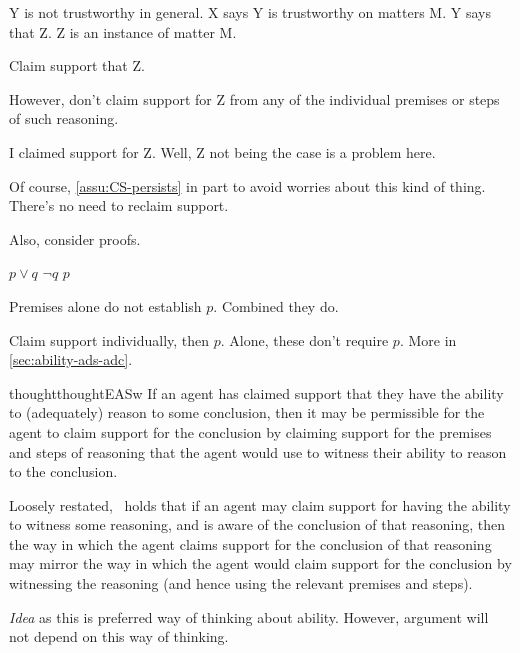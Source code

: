 \begin{note}
  Y is not trustworthy in general.
  X says Y is trustworthy on matters M.
  Y says that Z.
  Z is an instance of matter M.

  Claim support that Z.

  However, don't claim support for Z from any of the individual premises or steps of such reasoning.

  I claimed support for Z.
  Well, Z not being the case is a problem here.

  Of course, \ref{assu:CS-persists} in part to avoid worries about this kind of thing.
  There's no need to reclaim support.

  Also, consider proofs.

  \(p \lor q\)
  \(\lnot q\)
  \(p\)

  Premises alone do not establish \(p\).
  Combined they do.

  Claim support individually, then \(p\).
  Alone, these don't require \(p\).
  More in \autoref{sec:ability-ads-adc}.
\end{note}

\begin{note}[\EASw{}]
    \begin{restatable}[\EASw{-} --- \EASw{}]{thought}{thoughtEASw}\label{thought:EASw}
    If an agent has claimed support that they have the ability to (adequately) reason to some conclusion, then it may be permissible for the agent to claim support for the conclusion by claiming support for the premises and steps of reasoning that the agent would use to witness their ability to reason to the conclusion.
  \end{restatable}

  Loosely restated,~\EASw{} holds that if an agent may claim support for having the ability to witness some reasoning, and is aware of the conclusion of that reasoning, then the way in which the agent claims support for the conclusion of that reasoning may mirror the way in which the agent would claim support for the conclusion by witnessing the reasoning (and hence using the relevant premises and steps).
\end{note}

\begin{note}
  \emph{Idea} as this is preferred way of thinking about ability.
  However, argument will not depend on this way of thinking.
\end{note}

